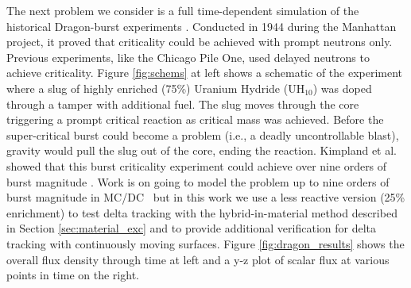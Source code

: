 The next problem we consider is a full time-dependent simulation of the historical Dragon-burst experiments \cite{kimpland2021dragon}.
Conducted in 1944 during the Manhattan project, it proved that criticality could be achieved with prompt neutrons only.
Previous experiments, like the Chicago Pile One, used delayed neutrons to achieve criticality.
Figure \ref{fig:schems} at left shows a schematic of the experiment where a slug of highly enriched (75\%) Uranium Hydride (UH$_{10}$) was doped through a tamper with additional fuel.
The slug moves through the core triggering a prompt critical reaction as critical mass was achieved.
Before the super-critical burst could become a problem (i.e., a deadly uncontrollable blast), gravity would pull the slug out of the core, ending the reaction.
Kimpland et al.~ showed that this burst criticality experiment could achieve over nine orders of burst magnitude \cite{kimpland2021dragon}.
Work is on going to model the problem up to nine orders of burst magnitude in MC/DC~\cite{variansyah_2025_dragon} but in this work we use a less reactive version (25\% enrichment) to test delta tracking with the hybrid-in-material method described in Section \ref{sec:material_exc} and to provide additional verification for delta tracking with continuously moving surfaces.
Figure \ref{fig:dragon_results} shows the overall flux density through time at left and a y-z plot of scalar flux at various points in time on the right.

